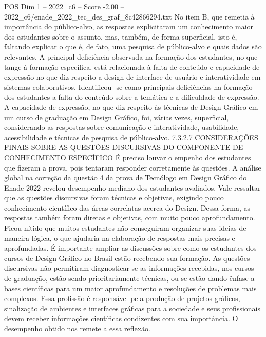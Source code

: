 \begin{textsample}{POS Dim 1 – 2022\_c6 – Score -2.00 – 2022\_c6/enade\_2022\_tec\_des\_graf\_8c42866294.txt}
No item B, que remetia à importância do público-alvo, as respostas explicitaram um conhecimento maior dos estudantes sobre o assunto, mas, também, de forma superficial, isto é, faltando explicar o que é, de fato, uma pesquisa de público-alvo e quais dados são relevantes.
A principal deficiência observada na formação dos estudantes, no que tange à formação específica, está relacionada à falta de conteúdo e capacidade de expressão no que diz respeito a design de interface de usuário e interatividade em sistemas colaborativos.
Identificou -se como principais deficiências na formação dos estudantes a falta do conteúdo sobre a temática e a dificuldade de expressão.
A capacidade de expressão, no que diz respeito às técnicas de Design Gráfico em um curso de graduação em Design Gráfico, foi, várias vezes, superficial, considerando as respostas sobre comunicação e interatividade, usabilidade, acessibilidade e técnicas de pesquisa de público-alvo. 7.3.2.7 CONSIDERAÇÕES FINAIS SOBRE AS QUESTÕES DISCURSIVAS DO COMPONENTE DE CONHECIMENTO ESPECÍFICO É preciso louvar o empenho dos estudantes que fizeram a prova, pois tentaram responder corretamente às questões.
A análise global na correção da questão 4 da prova de Tecnólogo em Design Gráfico do Enade 2022 revelou desempenho mediano dos estudantes avaliados.
Vale ressaltar que as questões discursivas foram técnicas e objetivas, exigindo pouco conhecimento científico das áreas correlatas acerca do Design.
Dessa forma, as respostas também foram diretas e objetivas, com muito pouco aprofundamento.
Ficou nítido que muitos estudantes não conseguiram organizar suas ideias de maneira lógica, o que ajudaria na elaboração de respostas mais precisas e aprofundadas.
É importante ampliar as discussões sobre como os estudantes dos cursos de Design Gráfico no Brasil estão recebendo sua formação.
As questões discursivas não permitiram diagnosticar se as informações recebidas, nos cursos de graduação, estão sendo prioritariamente técnicas, ou se estão dando ênfase a bases científicas para um maior aprofundamento e resoluções de problemas mais complexos.
Essa profissão é responsável pela produção de projetos gráficos, sinalização de ambientes e interfaces gráficas para a sociedade e seus profissionais devem receber informações científicas condizentes com sua importância.
O desempenho obtido nos remete a essa reflexão.

\end{textsample}

